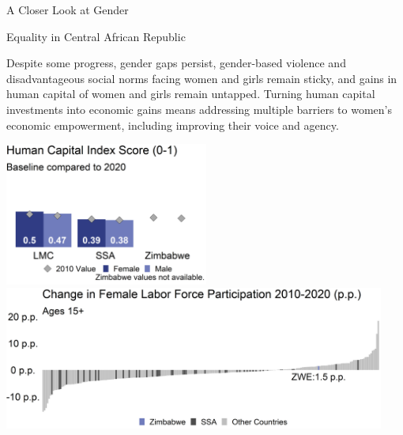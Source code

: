 \documentclass[
]{article}
\begin{document}
\begin{minipage}[c][1.4cm][t]{19.5cm}
\begin{minipage}[c][1.4cm][t]{6.5cm}
\fontsize{14}{1}\selectfont   
A Closer Look at Gender
  
\vspace{.2cm}
  
Equality in Central African Republic
\normalsize
\end{minipage}
\begin{minipage}[c][1.4cm][t]{12.75cm}
\fontsize{9}{8}\selectfont   
Despite some progress, gender gaps persist, gender-based violence and disadvantageous social norms facing women and girls remain sticky, and gains in human capital of women and girls remain untapped. Turning human capital investments into economic gains means addressing multiple barriers to women’s economic empowerment, including improving their voice and agency.
\normalsize
\end{minipage}
\end{minipage}

\vspace{.4cm}

\begin{minipage}[t][4.7cm][t]{19.5cm}
\href{https://genderdata.worldbank.org/indicators/hd-hci-ovrl}{\includegraphics[height=4.7cm]{HCIplot.png}}\hspace{.2cm}
\href{https://genderdata.worldbank.org/indicators/sl-tlf-acti-zs/}{\includegraphics[height=4.7cm]{LFPplot.png}}  
\end{minipage}

\vspace{.2cm}
\end{document}
